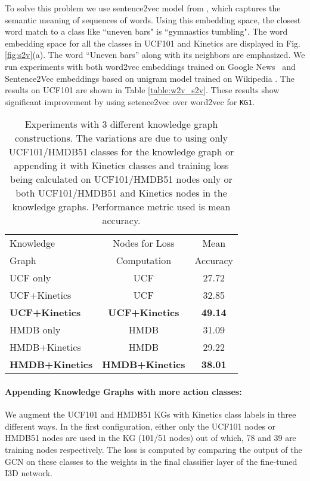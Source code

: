 To solve this problem we use sentence2vec model from \cite{pagliardini2017unsupervised}, which captures the semantic meaning of sequences of words. Using this embedding space, the closest word match to a class like ``uneven bars" is ``gymnastics tumbling". The word embedding space for all the classes in UCF101 and Kinetics are displayed in Fig.\ref{fig:s2v}(a).
The word ``Uneven bars'' along with its neighbors are emphasized.
We run experiments with both word2vec embeddings trained on Google News~\cite{mikolov2013efficient,mikolov2013distributed,mikolov2013linguistic} and Sentence2Vec embeddings based on unigram model trained on Wikipedia \cite{pagliardini2017unsupervised}. 
The results on UCF101 are shown in Table \ref{table:w2v_s2v}. These results show significant improvement by using setence2vec over word2vec for \texttt{KG1}.



\begin{table}
\centering
\caption{Experiments with 3 different knowledge graph constructions. The variations are due to using only UCF101/HMDB51 classes for the knowledge graph or appending it with Kinetics classes and training loss being calculated on UCF101/HMDB51 nodes only or both UCF101/HMDB51 and Kinetics nodes in the knowledge graphs. Performance metric used is mean accuracy.}
\begin{tabular}{@{}lcc@{}}
\toprule
Knowledge & Nodes for Loss & Mean \\
Graph & Computation & Accuracy\\
\midrule
UCF only & UCF   & 27.72  \\
UCF+Kinetics & UCF  & 32.85 \\
\bf{UCF+Kinetics} & \bf{UCF+Kinetics} & \bf{49.14} \\
\midrule
HMDB only & HMDB   & 31.09  \\
HMDB+Kinetics & HMDB & 29.22 \\
\bf{HMDB+Kinetics} & \bf{HMDB+Kinetics} & \bf{38.01} \\
\bottomrule
\end{tabular}
\label{table:graph_diff_abl}
\end{table}

\paragraph{\bf Appending Knowledge Graphs with more action classes:}
We augment the UCF101 and HMDB51 KGs with Kinetics class labels in three different ways. 
In the first configuration, either only the UCF101 nodes or HMDB51 nodes are used in the KG (101/51 nodes) out of which, 78 and 39 are training nodes respectively. The loss is computed by comparing the output of the GCN on these classes to the weights in the final classifier layer of the fine-tuned I3D network.



